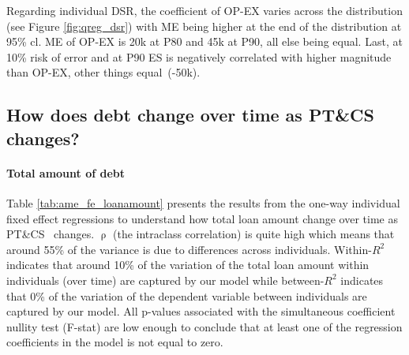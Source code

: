 \documentclass[a4paper, 11pt, onecolumn]{article}
\newcommand{\aebe}{all else being equal}
\newcommand{\ote}{other things equal}
\newcommand{\PTCS}{PT\&CS}
\begin{document}
Regarding individual DSR, the coefficient of OP-EX varies across the distribution (see Figure \ref{fig:qreg_dsr}) with ME being higher at the end of the distribution at 95\% cl.
ME of OP-EX is \rupee20k at P80 and \rupee45k at P90, \aebe.
Last, at 10\% risk of error and at P90 ES is negatively correlated with higher magnitude than OP-EX, \ote~(-\rupee50k).










	\subsection{How does debt change over time as \PTCS~ changes?}

\paragraph{Total amount of debt}
Table \ref{tab:ame_fe_loanamount} presents the results from the one-way individual fixed effect regressions to understand how total loan amount change over time as \PTCS~ changes.
$\uprho$ (the intraclass correlation) is quite high which means that around 55\% of the variance is due to differences across individuals. 
Within-$R^2$ indicates that around 10\% of the variation of the total loan amount within individuals (over time) are captured by our model while between-$R^2$ indicates that 0\% of the variation of the dependent variable between individuals are captured by our model.
All p-values associated with the simultaneous coefficient nullity test (F-stat) are low enough to conclude that at least one of the regression coefficients in the model is not equal to zero.
\end{document}
